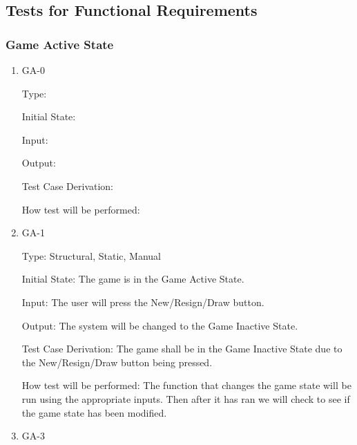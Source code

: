 \documentclass[12pt, titlepage]{article}
\begin{document}
\subsection{Tests for Functional Requirements}

\subsubsection{Game Active State}


\begin{enumerate}

\item{GA-0\\}

  Type: 
            
  Initial State: 
            
  Input: 
            
  Output: 
  
  Test Case Derivation: 
  
  How test will be performed:

\item{GA-1\\}

Type: Structural, Static, Manual
                    
Initial State: The game is in the Game Active State.
                    
Input: The user will press the New/Resign/Draw button.
                    
Output: The system will be changed to the Game Inactive State.
                    
Test Case Derivation: The game shall be in the Game Inactive State due to the New/Resign/Draw button being pressed.

How test will be performed: The function that changes the game state will be run using the appropriate inputs.
Then after it has ran we will check to see if the game state has been modified.

\item{GA-3\\}


\end{enumerate}
\end{document}
